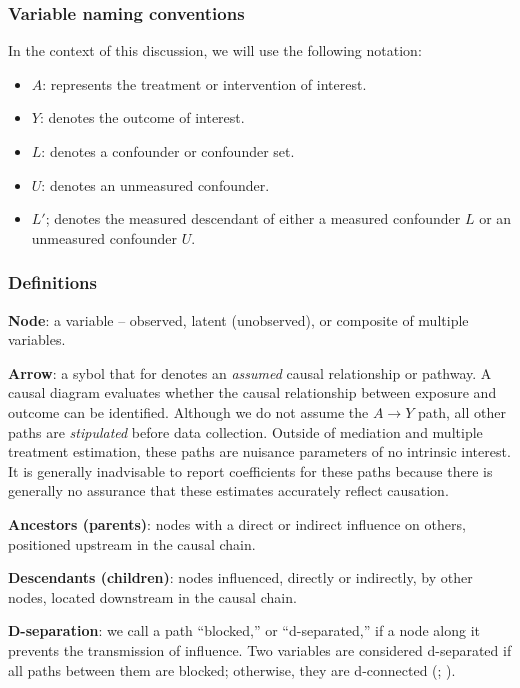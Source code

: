 \documentclass[
  singlecolumn,
  9pt]{article}
\providecommand{\tightlist}{%
  \setlength{\itemsep}{0pt}\setlength{\parskip}{0pt}}\usepackage{longtable,booktabs,array}
\begin{document}
\subsubsection{Variable naming
conventions}\label{variable-naming-conventions}

In the context of this discussion, we will use the following notation:

\begin{itemize}
\tightlist
\item
  \(A\): represents the treatment or intervention of interest.
\item
  \(Y\): denotes the outcome of interest.
\item
  \(L\): denotes a confounder or confounder set.
\item
  \(U\): denotes an unmeasured confounder.
\item
  \(L'\); denotes the measured descendant of either a measured
  confounder \(L\) or an unmeasured confounder \(U\).
\end{itemize}

\subsubsection{Definitions}\label{definitions}

\textbf{Node}: a variable -- observed, latent (unobserved), or composite
of multiple variables.

\textbf{Arrow}: a sybol that for denotes an \emph{assumed} causal
relationship or pathway. A causal diagram evaluates whether the causal
relationship between exposure and outcome can be identified. Although we
do not assume the \(A\to Y\) path, all other paths are \emph{stipulated}
before data collection. Outside of mediation and multiple treatment
estimation, these paths are nuisance parameters of no intrinsic
interest. It is generally inadvisable to report coefficients for these
paths because there is generally no assurance that these estimates
accurately reflect causation.

\textbf{Ancestors (parents)}: nodes with a direct or indirect influence
on others, positioned upstream in the causal chain.

\textbf{Descendants (children)}: nodes influenced, directly or
indirectly, by other nodes, located downstream in the causal chain.

\textbf{D-separation}: we call a path ``blocked,'' or ``d-separated,''
if a node along it prevents the transmission of influence. Two variables
are considered d-separated if all paths between them are blocked;
otherwise, they are d-connected (;
).
\end{document}
